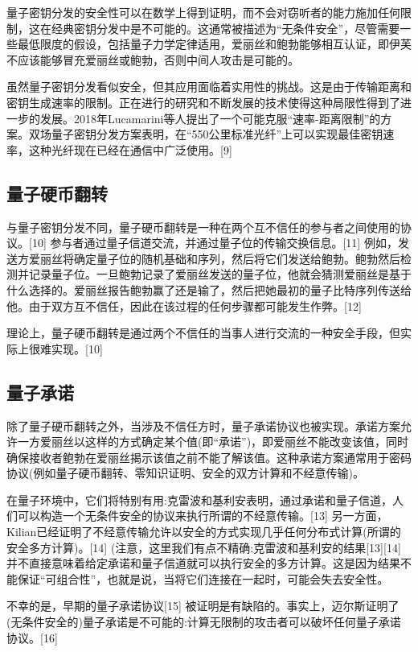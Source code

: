 量子密钥分发的安全性可以在数学上得到证明，而不会对窃听者的能力施加任何限制，这在经典密钥分发中是不可能的。这通常被描述为“无条件安全”，尽管需要一些最低限度的假设，包括量子力学定律适用，爱丽丝和鲍勃能够相互认证，即伊芙不应该能够冒充爱丽丝或鲍勃，否则中间人攻击是可能的。

虽然量子密钥分发看似安全，但其应用面临着实用性的挑战。这是由于传输距离和密钥生成速率的限制。正在进行的研究和不断发展的技术使得这种局限性得到了进一步的发展。2018年Lucamarini等人提出了一个可能克服“速率-距离限制”的方案。双场量子密钥分发方案表明，在“550公里标准光纤”上可以实现最佳密钥速率，这种光纤现在已经在通信中广泛使用。[9]

\subsection{量子硬币翻转}
与量子密钥分发不同，量子硬币翻转是一种在两个互不信任的参与者之间使用的协议。[10] 参与者通过量子信道交流，并通过量子位的传输交换信息。[11] 例如，发送方爱丽丝将确定量子位的随机基础和序列，然后将它们发送给鲍勃。鲍勃然后检测并记录量子位。一旦鲍勃记录了爱丽丝发送的量子位，他就会猜测爱丽丝是基于什么选择的。爱丽丝报告鲍勃赢了还是输了，然后把她最初的量子比特序列传送给他。由于双方互不信任，因此在该过程的任何步骤都可能发生作弊。[12]

理论上，量子硬币翻转是通过两个不信任的当事人进行交流的一种安全手段，但实际上很难实现。[10]

\subsection{量子承诺}
除了量子硬币翻转之外，当涉及不信任方时，量子承诺协议也被实现。承诺方案允许一方爱丽丝以这样的方式确定某个值(即“承诺”)，即爱丽丝不能改变该值，同时确保接收者鲍勃在爱丽丝揭示该值之前不能了解该值。这种承诺方案通常用于密码协议(例如量子硬币翻转、零知识证明、安全的双方计算和不经意传输)。

在量子环境中，它们将特别有用:克雷波和基利安表明，通过承诺和量子信道，人们可以构造一个无条件安全的协议来执行所谓的不经意传输。[13] 另一方面，Kilian已经证明了不经意传输允许以安全的方式实现几乎任何分布式计算(所谓的安全多方计算)。[14] (注意，这里我们有点不精确:克雷波和基利安的结果[13][14] 并不直接意味着给定承诺和量子信道就可以执行安全的多方计算。这是因为结果不能保证“可组合性”，也就是说，当将它们连接在一起时，可能会失去安全性。

不幸的是，早期的量子承诺协议[15] 被证明是有缺陷的。事实上，迈尔斯证明了(无条件安全的)量子承诺是不可能的:计算无限制的攻击者可以破坏任何量子承诺协议。[16]

